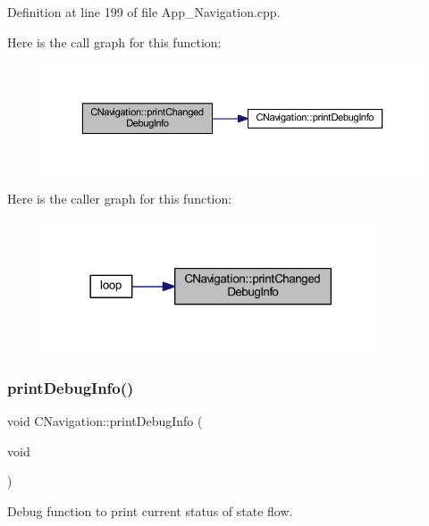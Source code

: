 Definition at line 199 of file App\+\_\+\+Navigation.\+cpp.

Here is the call graph for this function\+:\nopagebreak
\begin{figure}[H]
\begin{center}
\leavevmode
\includegraphics[width=350pt]{class_c_navigation_ac491c77788ba2e953a704b6ad622a665_cgraph}
\end{center}
\end{figure}
Here is the caller graph for this function\+:\nopagebreak
\begin{figure}[H]
\begin{center}
\leavevmode
\includegraphics[width=282pt]{class_c_navigation_ac491c77788ba2e953a704b6ad622a665_icgraph}
\end{center}
\end{figure}
\mbox{\label{class_c_navigation_a84e320cd8975593ab6f966e8794b2886}} 
\subsubsection{\texorpdfstring{printDebugInfo()}{printDebugInfo()}}
{\footnotesize\ttfamily void C\+Navigation\+::print\+Debug\+Info (\begin{DoxyParamCaption}\item[{void}]{ }\end{DoxyParamCaption})\hspace{0.3cm}{\ttfamily [virtual]}}



Debug function to print current status of state flow. 



